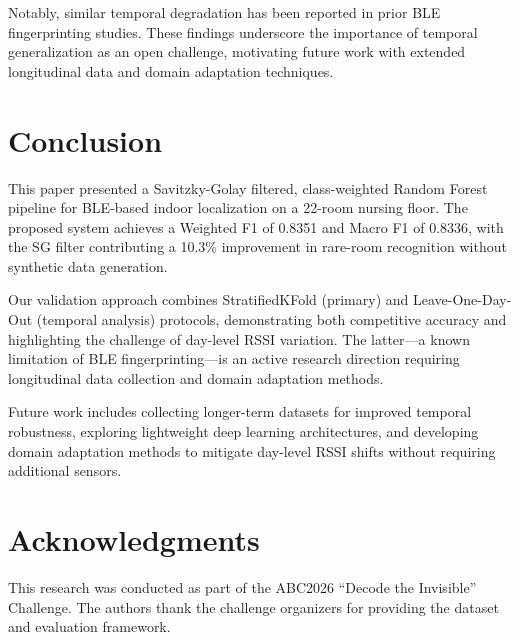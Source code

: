 \documentclass{iopconfser}
\begin{document}
Notably, similar temporal degradation has been reported in prior BLE fingerprinting studies. These findings underscore the importance of temporal generalization as an open challenge, motivating future work with extended longitudinal data and domain adaptation techniques.

\section{Conclusion}
\label{sec:conclusion}

This paper presented a Savitzky-Golay filtered, class-weighted Random Forest pipeline for BLE-based indoor localization on a 22-room nursing floor. The proposed system achieves a Weighted F1 of 0.8351 and Macro F1 of 0.8336, with the SG filter contributing a 10.3\% improvement in rare-room recognition without synthetic data generation.

Our validation approach combines StratifiedKFold (primary) and Leave-One-Day-Out (temporal analysis) protocols, demonstrating both competitive accuracy and highlighting the challenge of day-level RSSI variation. The latter---a known limitation of BLE fingerprinting---is an active research direction requiring longitudinal data collection and domain adaptation methods.

Future work includes collecting longer-term datasets for improved temporal robustness, exploring lightweight deep learning architectures, and developing domain adaptation methods to mitigate day-level RSSI shifts without requiring additional sensors.

\section*{Acknowledgments}

This research was conducted as part of the ABC2026 ``Decode the Invisible'' Challenge. The authors thank the challenge organizers for providing the dataset and evaluation framework.



\end{document}
